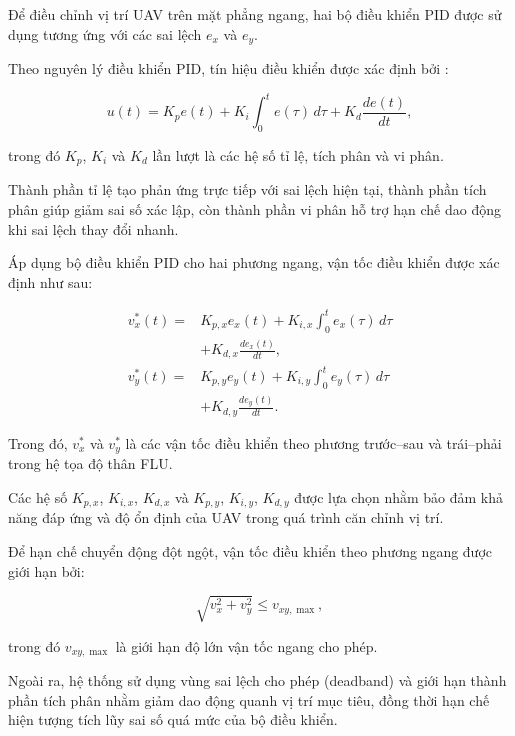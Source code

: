 Để điều chỉnh vị trí UAV trên mặt phẳng ngang,
hai bộ điều khiển PID được sử dụng tương ứng
với các sai lệch $e_x$ và $e_y$.

Theo nguyên lý điều khiển PID, tín hiệu điều
khiển được xác định bởi \cite{astrom1995pid}:

\begin{equation}
u(t)
=
K_p e(t)
+
K_i\int_0^t e(\tau)\,d\tau
+
K_d\frac{de(t)}{dt},
\label{eq:landing_pid_general}
\end{equation}

trong đó $K_p$, $K_i$ và $K_d$ lần lượt là
các hệ số tỉ lệ, tích phân và vi phân.

Thành phần tỉ lệ tạo phản ứng trực tiếp
với sai lệch hiện tại, thành phần tích phân
giúp giảm sai số xác lập, còn thành phần vi
phân hỗ trợ hạn chế dao động khi sai lệch
thay đổi nhanh.

Áp dụng bộ điều khiển PID cho hai phương
ngang, vận tốc điều khiển được xác định như sau:

\begin{equation}
\begin{aligned}
v_x^{*}(t)
={}&K_{p,x}e_x(t)
+K_{i,x}\int_0^t e_x(\tau)\,d\tau\\
&+K_{d,x}\frac{de_x(t)}{dt},\\[6pt]
v_y^{*}(t)
={}&K_{p,y}e_y(t)
+K_{i,y}\int_0^t e_y(\tau)\,d\tau\\
&+K_{d,y}\frac{de_y(t)}{dt}.
\end{aligned}
\label{eq:landing_pid_xy}
\end{equation}

Trong đó, $v_x^{*}$ và $v_y^{*}$ là các vận
tốc điều khiển theo phương trước--sau và
trái--phải trong hệ tọa độ thân FLU.

Các hệ số $K_{p,x}$, $K_{i,x}$, $K_{d,x}$
và $K_{p,y}$, $K_{i,y}$, $K_{d,y}$ được
lựa chọn nhằm bảo đảm khả năng đáp ứng
và độ ổn định của UAV trong quá trình
căn chỉnh vị trí.

Để hạn chế chuyển động đột ngột, vận tốc
điều khiển theo phương ngang được giới
hạn bởi:

\begin{equation}
\sqrt{v_x^2+v_y^2}
\leq v_{xy,\max},
\label{eq:landing_velocity_limit}
\end{equation}

trong đó $v_{xy,\max}$ là giới hạn độ lớn
vận tốc ngang cho phép.

Ngoài ra, hệ thống sử dụng vùng sai lệch
cho phép (deadband) và giới hạn thành phần
tích phân nhằm giảm dao động quanh vị trí
mục tiêu, đồng thời hạn chế hiện tượng
tích lũy sai số quá mức của bộ điều khiển.

